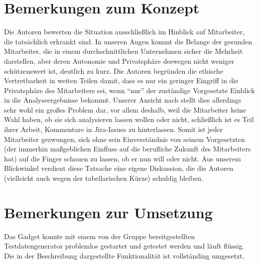 \documentclass[oneside,12pt,a4paper,fleqn]{article}
\begin{document}
\section{Bemerkungen zum Konzept}


Die Autoren bewerten die Situation ausschließlich im Hinblick auf Mitarbeiter, die tatsächlich erkrankt sind. In unseren Augen kommt die Belange der gesunden Mitarbeiter, die in einem durchschnittlichen Unternehmen sicher die Mehrheit darstellen, aber deren Autonomie und Privatsphäre deswegen nicht weniger schützenswert ist, deutlich zu kurz.
Die Autoren begründen die ethische Vertretbarkeit in weiten Teilen damit, dass es nur ein geringer Eingriff in die Privatsphäre des Mitarbeiters sei, wenn ``nur'' der zuständige Vorgesetzte Einblick in die Analyseergebnisse bekommt. Unserer Ansicht nach stellt dies allerdings sehr wohl ein großes Problem dar, vor allem deshalb, weil die Mitarbeiter keine Wahl haben, ob sie sich analysieren lassen wollen oder nicht, schließlich ist es Teil ihrer Arbeit, Kommentare in Jira-Issues zu hinterlassen. Somit ist jeder Mitarbeiter gezwungen, sich ohne sein Einverständnis von seinem Vorgesetzten (der immerhin maßgeblichen Einfluss auf die berufliche Zukunft des Mitarbeiters hat) auf die Finger schauen zu lassen, ob er nun will oder nicht. Aus unserem Blickwinkel verdient diese Tatsache eine eigene Diskussion, die die Autoren (vielleicht auch wegen der tabellarischen Kürze) schuldig bleiben.



\section{Bemerkungen zur Umsetzung}

Das Gadget konnte mit einem von der Gruppe bereitgestellten Testdatengenerator problemlos gestartet und getestet werden und läuft flüssig. Die in der Beschreibung dargestellte Funktionalität ist vollständing umgesetzt.

\medskip
\end{document}
